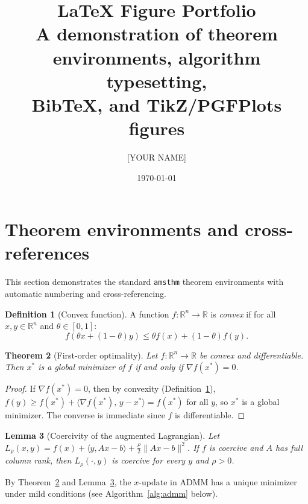 \documentclass[11pt,a4paper]{article}
\title{\LaTeX{} Figure Portfolio\\[4pt]
\large A demonstration of theorem environments, algorithm typesetting,\\
BibTeX, and TikZ/PGFPlots figures}
\author{[YOUR NAME]}
\date{\today}
\newtheorem{theorem}{Theorem}[section]
\newtheorem{lemma}[theorem]{Lemma}
\theoremstyle{definition}
\newtheorem{definition}[theorem]{Definition}
\theoremstyle{remark}
\begin{document}
\maketitle
\tableofcontents
\newpage

\section{Theorem environments and cross-references}

This section demonstrates the standard \texttt{amsthm} theorem environments
with automatic numbering and cross-referencing.

\begin{definition}[Convex function]
\label{def:convex}
A function $f : \mathbb{R}^n \to \mathbb{R}$ is \emph{convex} if for all
$x, y \in \mathbb{R}^n$ and $\theta \in [0,1]$:
\begin{equation}
\label{eq:convex_def}
f(\theta x + (1-\theta) y) \le \theta f(x) + (1-\theta) f(y).
\end{equation}
\end{definition}

\begin{theorem}[First-order optimality]
\label{thm:first_order}
Let $f : \mathbb{R}^n \to \mathbb{R}$ be convex and differentiable. Then
$x^*$ is a global minimizer of $f$ if and only if $\nabla f(x^*) = 0$.
\end{theorem}

\begin{proof}
If $\nabla f(x^*) = 0$, then by convexity (Definition~\ref{def:convex}),
$f(y) \ge f(x^*) + \langle \nabla f(x^*),\, y - x^* \rangle = f(x^*)$
for all $y$, so $x^*$ is a global minimizer. The converse is immediate
since $f$ is differentiable.
\end{proof}

\begin{lemma}[Coercivity of the augmented Lagrangian]
\label{lem:coercive}
Let $L_\rho(x, y) = f(x) + \langle y, Ax - b \rangle + \frac{\rho}{2}\|Ax - b\|^2$.
If $f$ is coercive and $A$ has full column rank, then $L_\rho(\cdot, y)$
is coercive for every $y$ and $\rho > 0$.
\end{lemma}

By Theorem~\ref{thm:first_order} and Lemma~\ref{lem:coercive}, the
$x$-update in ADMM has a unique minimizer under mild conditions
(see Algorithm~\ref{alg:admm} below).
\end{document}
